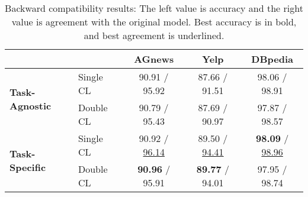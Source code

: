 \begin{table*}[h]
    \centering
    \begin{tabular}{|l|l|c|c|c|}
        \hline
        \multicolumn{2}{|c|}{} & \textbf{AGnews} & \textbf{Yelp} & \textbf{DBpedia} \\
        \hline
        \multirow{2}{*}{\textbf{Task-Agnostic}} & Single CL & 90.91 / 95.92 & 87.66 / 91.51 & 98.06 / 98.91 \\
        & Double CL & 90.79 / 95.43 & 87.69 / 90.97 & 97.87 / 98.57 \\
        \hline
        \multirow{2}{*}{\textbf{Task-Specific}} & Single CL & 90.92 / \underline{96.14} & 89.50 / \underline{94.41} & \textbf{98.09} / \underline{98.96} \\
        & Double CL & \textbf{90.96} / 95.91 & \textbf{89.77} / 94.01 & 97.95 / 98.74 \\
        \hline
    \end{tabular}
    \caption{Backward compatibility results: The left value is accuracy and the right value is agreement with the original model. Best accuracy is in bold, and best agreement is underlined.}
    \label{tab:backward_compatibility_results}
\end{table*}